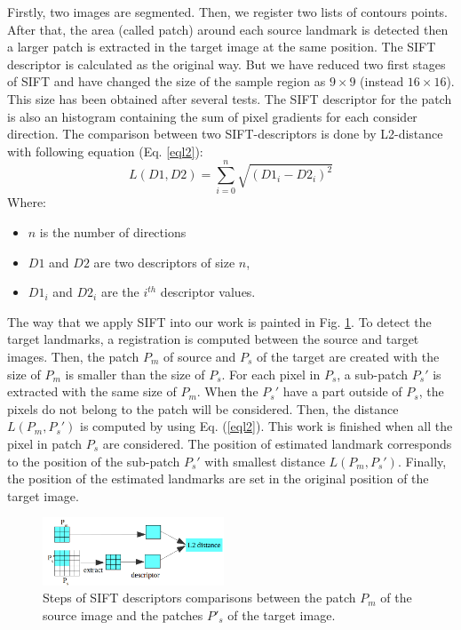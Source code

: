 \documentclass{gretsi}
\begin{document}
Firstly, two images are segmented. Then, we register two lists of contours points. After that, the area (called patch) around each source landmark is detected then a larger patch is extracted in the target image at the same position. The SIFT descriptor is calculated as the original way. But we have reduced two first stages of SIFT and have changed the size of the sample region as $9 \times 9$ (instead $16 \times 16$). This size has been obtained after several tests. The SIFT descriptor for the patch is also an histogram containing the sum of pixel gradients for each consider direction. The comparison between two SIFT-descriptors is done by L2-distance with following equation (Eq. \ref{eql2}):
\begin{equation}
\label{eql2}
	L(D1,D2) = \sum\limits_{i = 0}^{n}\sqrt{(D1_i-D2_i)^2}
\end{equation}
Where:
\begin{itemize}%
	\item $n$ is the number of directions
	\item $D1$ and $D2$ are two descriptors of size $n$,
	\item $D1_i$ and $D2_i $ are the $i^{th}$ descriptor values.
\end{itemize}
The way that we apply SIFT into our work is painted in Fig. \ref{fig4}. To detect the target landmarks, a registration is computed between the source and target images. Then, the patch $P_m$ of source and $P_s$ of the target are created with the size of $P_m$ is smaller than the size of $P_s$. For each pixel in $P_s$, a sub-patch $P_s'$ is extracted with the same size of $P_m$. When the $P_s'$ have a part outside of $P_s$, the pixels do not belong to the patch will be considered. Then, the distance $L(P_m,P_s')$ is computed by using Eq. (\ref{eql2}). This work is finished when all the pixel in patch $P_s$ are considered. The position of estimated landmark corresponds to the position of the sub-patch $P_s'$ with smallest distance $L(P_m,P_s')$. Finally, the position of the estimated landmarks are set in the original position of the target image.
\begin{figure}[htb]
    \centering
    \includegraphics[width=0.48\textwidth]{./images/illustration_SIFT}
    \caption{Steps of SIFT descriptors comparisons between the patch $P_m$ of the source image and the patches $P'_s$ of the target image.}
    \label{fig4}
\end{figure}
\end{document}
